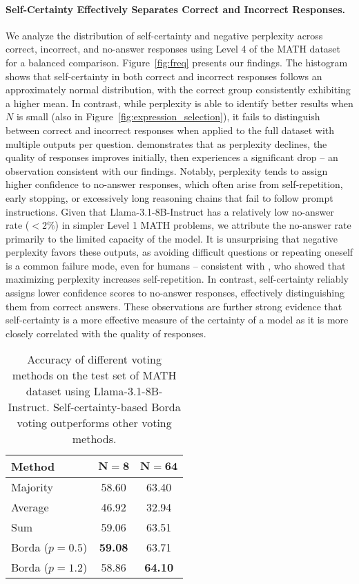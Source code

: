 \paragraph{Self-Certainty Effectively Separates Correct and Incorrect Responses.}
We analyze the distribution of self-certainty and negative perplexity across correct, incorrect, and no-answer responses using Level 4 of the MATH dataset for a balanced comparison. Figure~\ref{fig:freq} presents our findings. The histogram shows that self-certainty in both correct and incorrect responses follows an approximately normal distribution, with the correct group consistently exhibiting a higher mean. In contrast, while perplexity is able to identify better results when \(N\) is small (also in Figure~\ref{fig:expression_selection}), it fails to distinguish between correct and incorrect responses when applied to the full dataset with multiple outputs per question. \citet{zhang2020trading} demonstrates that as perplexity declines, the quality of responses improves initially, then experiences a significant drop -- an observation consistent with our findings. Notably, perplexity tends to assign higher confidence to no-answer responses, which often arise from self-repetition, early stopping, or excessively long reasoning chains that fail to follow prompt instructions. Given that Llama-3.1-8B-Instruct has a relatively low no-answer rate (\(< 2\% \)) in simpler Level 1 MATH problems, we attribute the no-answer rate primarily to the limited capacity of the model. It is unsurprising that negative perplexity favors these outputs, as avoiding difficult questions or repeating oneself is a common failure mode, even for humans -- consistent with \citet{basu2020mirostat}, who showed that maximizing perplexity increases self-repetition. In contrast, self-certainty reliably assigns lower confidence scores to no-answer responses, effectively distinguishing them from correct answers. These observations are further strong evidence that self-certainty is a more effective measure of the certainty of a model as it is more closely correlated with the quality of responses.

\begin{table}[t]
\centering
\caption{Accuracy of different voting methods on the test set of MATH dataset using Llama-3.1-8B-Instruct. Self-certainty-based Borda voting outperforms other voting methods.}
\vspace{0.5em}
\label{tab:voting}
\small
\begin{tabular}{@{}lcc@{}}
\toprule
\textbf{Method} & \textbf{\(\boldsymbol{N = 8}\)} & \textbf{\(\boldsymbol{N = 64}\)} \\ 
\midrule
Majority & 58.60 & 63.40  \\
Average             & 46.92 & 32.94\\
Sum                 &  59.06 & 63.51 \\
Borda (\(p=0.5\))   & \textbf{59.08}  & 63.71  \\
Borda (\(p=1.2\))   & 58.86  & \textbf{64.10}  \\
\bottomrule
\end{tabular}
\end{table}

